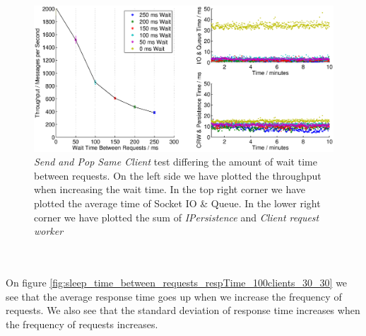 \documentclass{article}
\begin{document}
             \begin{figure}[H]
                \begin{adjustwidth}{-2.5cm}{}
                    \centering
                    \includegraphics[scale=0.65]{sleep_time_between_requests_100clients_30_30}
                    \caption{\textit{Send and Pop Same Client} test differing the amount of wait time between requests. On the left side we have plotted the throughput when increasing the wait time. In the top right corner we have plotted the average time of Socket IO \& Queue. In the lower right corner we have plotted the sum of \textit{IPersistence} and \textit{Client request worker}}
                    \label{fig:sleep_time_between_requests_100clients_30_30}
                \end{adjustwidth}
             \end{figure}
             ~\\
             \\
             On figure \ref{fig:sleep_time_between_requests_respTime_100clients_30_30} we see that the average response time goes up when we increase the frequency of requests. We also see that the standard deviation of response time increases when the frequency of requests increases.\\
             \\
\end{document}
